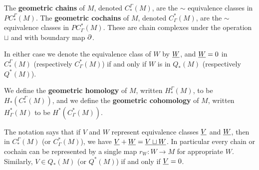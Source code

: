 \begin{definition}
The \textbf{geometric chains} of $M$, denoted $C^\Gamma_*(M)$, are the $\sim$ equivalence classes in $PC^\Gamma_*(M)$.
The \textbf{geometric cochains} of $M$, denoted $C_\Gamma^*(M)$, are the $\sim$ equivalence classes in $PC_\Gamma^*(M)$.
These are chain complexes under the operation $\sqcup$ and with boundary map $\partial$.

In either case we denote the equivalence class of $W$ by $\underline{W}$, and $\underline{W} = 0$ in $C^\Gamma_*(M)$ (respectively $C_\Gamma^*(M)$) if and only if $W$ is in $Q_*(M)$ (respectively $Q^*(M)$).

We define the \textbf{geometric homology} of $M$, written $H_*^\Gamma(M)$, to be $H_*(C^\Gamma_*(M))$, and
we define the \textbf{geometric cohomology} of $M$, written $H^*_\Gamma(M)$ to be $H^*(C_\Gamma^*(M))$.
\end{definition}

The notation says that if $V$ and $W$ represent equivalence classes $\underline{V}$ and $\underline{W}$, then in $C_*^{\Gamma}(M)$ (or $C^*_\Gamma(M)$), we have $\underline{V}+\underline{W} = \underline{V\sqcup W}$. In particular every chain or cochain can be represented by a single map $r_W \colon W \to M$ for appropriate $W$. Similarly, $V \in Q_*(M)$ (or $Q^*(M)$) if and only if $\underline{V} = 0$.


